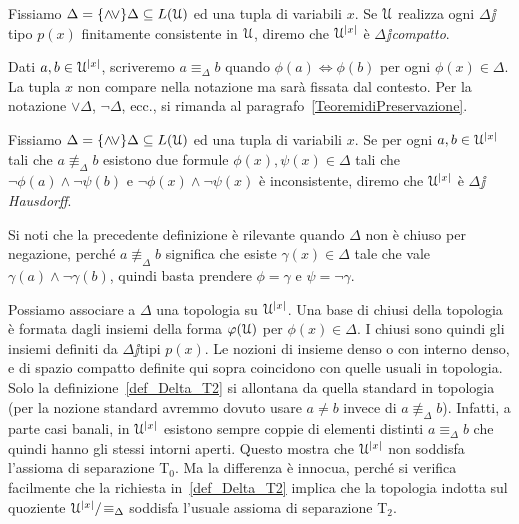 \begin{definition}\label{def_Delta_ceompatto} Fissiamo $\Delta=\{\wedge\!\vee\}\Delta\subseteq L(\EuScript U)$ ed una tupla di variabili $x$. Se $\EuScript U$ realizza ogni  $\Delta\jj$tipo $p(x)$ finitamente consistente in $\EuScript U$, diremo che  $\EuScript U^{|x|}$ \`e \emph{$\Delta\jj$compatto}.\QED
\end{definition}

Dati $a,b\in\EuScript U^{|x|}$, scriveremo $a\equiv_{\Delta} b$ quando $\phi(a)\iff\phi(b)$ per ogni $\phi(x)\in\Delta$. La tupla $x$ non compare nella notazione ma sar\`a fissata dal contesto. Per la notazione $\vee\Delta$, $\neg\Delta$, ecc., si rimanda al paragrafo~\ref{TeoremidiPreservazione}. 

\begin{definition}\label{def_Delta_T2}  Fissiamo $\Delta=\{\wedge\!\vee\}\Delta\subseteq L(\EuScript U)$ ed una tupla di variabili $x$. Se per ogni $a,b\in\EuScript U^{|x|}$ tali che $a\nequiv_{\Delta} b$ esistono due formule $\phi(x),\psi(x)\in\Delta$ tali che $\neg\phi(a)\wedge\neg\psi(b)$ e $\neg\phi(x)\wedge\neg\psi(x)$ \`e inconsistente, diremo che $\EuScript U^{|x|}$ \`e \emph{$\Delta\jj$Hausdorff}.\QED
\end{definition}

Si noti che la precedente definizione \`e rilevante quando $\Delta$ non \`e chiuso per negazione, perch\'e $a\nequiv_{\Delta} b$ significa che esiste $\gamma(x) \in \Delta$ tale che vale $\gamma(a) \wedge \neg\gamma(b)$, quindi basta prendere $\phi=\gamma$ e $\psi=\neg\gamma$.

Possiamo associare a $\Delta$ una topologia su $\EuScript U^{|x|}$. Una base di chiusi della topologia \`e formata dagli insiemi della forma $\varphi(\EuScript U)$ per $\phi(x)\in\Delta$. I chiusi sono quindi gli insiemi definiti da $\Delta\jj$tipi $p(x)$. Le nozioni di insieme denso o con interno denso, e di spazio compatto definite qui sopra coincidono con quelle usuali in topologia. Solo la definizione~\ref{def_Delta_T2} si allontana da quella standard in topologia (per la nozione standard avremmo dovuto usare $a\neq b$ invece di $a\nequiv_{\Delta} b$). Infatti, a parte casi banali, in $\EuScript U^{|x|}$ esistono sempre coppie di elementi distinti $a\equiv_\Delta b$ che quindi hanno gli stessi intorni aperti. Questo mostra che $\EuScript U^{|x|}$ non soddisfa l'assioma di separazione T$_0$. Ma la differenza \`e innocua,  perch\'e si verifica facilmente che la richiesta in~\ref{def_Delta_T2} implica che la topologia indotta sul quoziente $\EuScript U^{|x|}/\!\equiv_{\Delta}$ soddisfa l'usuale assioma di separazione T$_2$.
% 

